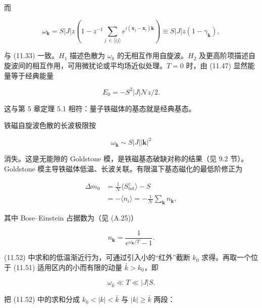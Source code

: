 而

\begin{equation*}
\omega_ {\mathbf {k}} = S | J | z \left( 1 - z ^ {- 1} \sum_{j \, \in \langle ij \rangle} e ^ {i ( \mathbf {x} _ {j} - \mathbf {x} _ {i} ) \mathbf {k}} \right) \equiv S | J | z \left( 1 - \gamma_ {\mathbf {k}} \right) ,
\tag{11.49}
\end{equation*}

与 (11.33) 一致。$H_{1}$ 描述色散为 $\omega_{k}$ 的无相互作用自旋波。$H_{2}$ 及更高阶项描述自旋波间的相互作用，可用微扰论或平均场近似处理。$T = 0$ 时，由 (11.47) 显然能量等于经典能量

\begin{equation*}
E _ {0} = - S ^ {2} | J | \mathcal {N} z / 2.
\tag{11.50}
\end{equation*}

这与第 5 章定理 5.1 相符：量子铁磁体的基态就是经典基态。

铁磁自旋波色散的长波极限按

\begin{equation*}
\omega_ {\mathbf {k}} \sim S | J | | \mathbf {k} | ^ {2}
\tag{11.51}
\end{equation*}

消失。这是无能隙的 Goldstone 模，是铁磁基态破缺对称的结果（见 9.2 节）。Goldstone 模主导铁磁体低温、长波关联。有限温下基态磁化的最低阶修正为

\begin{align*}
\Delta m _ {0} & = \frac {1}{\mathcal {N}} \langle S _ {\mathrm{tot}} ^ {z} \rangle - S\\
& = - \langle n _ {i} \rangle = - \frac {1}{\mathcal {N}} \sum_ {\mathbf {k}} n _ {\mathbf {k}} ,
\tag{11.52}
\end{align*}

其中 Bose--Einstein 占据数为（见 (A.25)）

\begin{equation*}
n _ {\mathbf {k}} = \frac {1}{e ^ {\omega_ {\mathbf {k}} / T} - 1}.
\tag{11.53}
\end{equation*}

(11.52) 中求和的低温渐近行为，可通过引入小的“红外”截断 $k_{0}$ 求得。再取一个位于 (11.51) 适用区内的小而有限的动量 $\bar{k} > k_{0}$，即

\begin{equation*}
\omega_ {\bar {k}} \ll T \ll | J | S.
\tag{11.54}
\end{equation*}

把 (11.52) 中的求和分成 $k_{0} < |k| < \bar{k}$ 与 $|k| \geq \bar{k}$ 两段：

